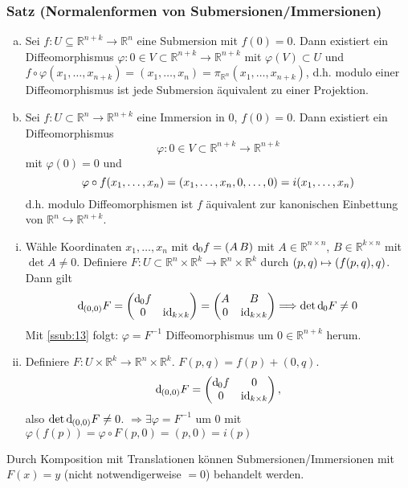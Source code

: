 \subsubsection{Satz (Normalenformen von Submersionen/Immersionen)} %
\label{ssub:15}
\begin{enumerate}[a)]
	\item Sei $f : U \subseteq \mathds{R}^{n+k} \to \mathds{R}^n$ eine Submersion mit $f(0)=0$. Dann existiert ein Diffeomorphismus 
	$\varphi : 0 \in V \subset \mathds{R}^{n+k} \to \mathds{R}^{n+k}$ mit $\varphi(V) \subset U$ und 
	$f \circ \varphi(x_1, \ldots , x_{n+k}) = (x_1, \ldots , x_n) = \pi_{\mathds{R}^n}(x_1, \ldots , x_{n+k})$, d.h. modulo einer Diffeomorphismus ist jede Submersion 
	äquivalent zu einer Projektion.
	\item Sei $f : U \subset \mathds{R}^n \to \mathds{R}^{n+k}$ eine Immersion in $0$, $f(0)=0$. Dann existiert ein Diffeomorphismus 
	\[
		\varphi : 0 \in V \subset \mathds{R}^{n+k} \to \mathds{R}^{n+k}
	\]
	mit $\varphi(0)=0$ und 
	\[
		\varphi \circ f (x_1, \ldots ,x _n) = \enbrace*{x_1, \ldots , x_n, 0 , \ldots , 0} = i(x_1, \ldots , x_n) 
	\]
	d.h. modulo Diffeomorphismen ist $f$ äquivalent zur kanonischen Einbettung von $\mathds{R}^n \hookrightarrow \mathds{R}^{n+k}$.
\end{enumerate}
\begin{enumerate}[(i)]
	\item Wähle Koordinaten $x_1, \ldots , x_n$ mit $\mathd_0 f = (A \, B)$ mit $A \in \mathds{R}^{n \times n}$, $B \in \mathds{R}^{k \times n}$ mit $\det A \not= 0$.
	Definiere $F : U \subset \mathds{R}^n \times \mathds{R}^k \to \mathds{R}^n \times \mathds{R}^k $ durch $(p,q) \mapsto \enbrace*{f(p,q), q}$. Dann gilt
	\[
		\mathd_{(0,0)} F = \begin{pmatrix}
			\mathd_0 f & \\
			0 & \id_{k \times k}
		\end{pmatrix} = \begin{pmatrix}
			A & B \\
			0 & \id_{k \times k} 
		\end{pmatrix}
		\Longrightarrow \det \mathd_0 F \not= 0
	\]
	Mit \ref{ssub:13} folgt: $\varphi = F ^{-1}$ Diffeomorphismus um $0 \in \mathds{R}^{n+k}$ herum.
	\item Definiere $F : U \times \mathds{R}^k \to \mathds{R}^n \times \mathds{R}^k$. $F(p,q) = f(p)+ (0,q)$.
	\[
		\mathd_{(0,0)} F = \begin{pmatrix}
			\mathd_0 f & 0 \\
			0 & \id_{k \times k}
		\end{pmatrix},
	\]
	also $\det \mathd_{(0,0)} F \not= 0$. $\Rightarrow  \exists \varphi = F ^{-1}$ um $0$ mit $\varphi(f(p))=\varphi \circ F (p,0) = (p,0) = i(p)$ \bewende
\end{enumerate}
Durch Komposition mit Translationen können Submersionen/Immersionen mit $F(x)=y$ (nicht notwendigerweise $=0$) behandelt werden.

